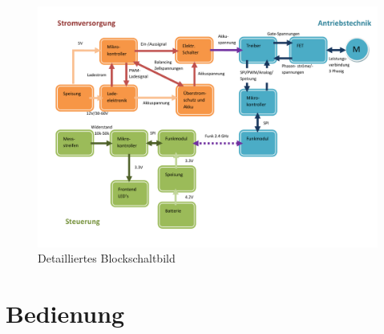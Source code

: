 \begin{figure}[H]
	\centering
	\includegraphics[width=\linewidth]{images/Grobkonzept_Blockschaltbild_detailliert}
	\caption[Detailliertes Blockschaltbild]{Detailliertes Blockschaltbild}
	\label{fig:grobkonzeptblockschaltbilddetailliert}
\end{figure}




\section{Bedienung}
